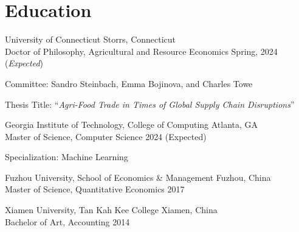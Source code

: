 \documentclass[11 pt,letterpaper]{article}
\renewenvironment{itemize}{
	\begin{list}{}{
			\setlength{\leftmargin}{1.5em}
		}
	}{
	\end{list}
}
\begin{document}
	\section*{\textbf{ Education}}
	\begin{itemize}
		\item[-]  University of Connecticut  \hfill Storrs, Connecticut \\
	 Doctor of Philosophy, Agricultural and Resource Economics  \hfill  Spring, 2024 (\textit{Expected})
	
			
			Committee:	 	 Sandro Steinbach,	Emma Bojinova, and Charles Towe 
			
			Thesis Title: ``\textit{Agri-Food Trade in Times of Global Supply Chain Disruptions}''
			
 
		 
	
		 \item[-]    Georgia Institute of Technology, College of  Computing \hfill   Atlanta, GA   \\ 
		 Master of Science, Computer Science  \hfill      2024 (Expected)
 
	Specialization: Machine Learning
 
		\item[-]  Fuzhou University, School of Economics \& Management \hfill Fuzhou, China \\ 
		Master of Science,   Quantitative Economics  \hfill    2017
		
				
		\item[-]  Xiamen University, Tan Kah Kee College    \hfill  Xiamen, China \\
		Bachelor of Art,  Accounting \hfill    2014
		

\end{itemize}
\end{document}
